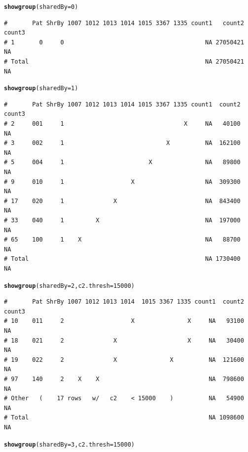 \documentclass{article}\usepackage[]{graphicx}\usepackage[]{color}
\makeatletter
\newcommand{\hlnum}[1]{\textcolor[rgb]{0.686,0.059,0.569}{#1}}%
\newcommand{\hlstd}[1]{\textcolor[rgb]{0.345,0.345,0.345}{#1}}%
\newcommand{\hlkwc}[1]{\textcolor[rgb]{0.333,0.667,0.333}{#1}}%
\newcommand{\hlkwd}[1]{\textcolor[rgb]{0.737,0.353,0.396}{\textbf{#1}}}%
\newenvironment{kframe}{%
 \def\at@end@of@kframe{}%
 \ifinner\ifhmode%
  \def\at@end@of@kframe{\end{minipage}}%
  \begin{minipage}{\columnwidth}%
 \fi\fi%
 \def\FrameCommand##1{\hskip\@totalleftmargin \hskip-\fboxsep
 \colorbox{shadecolor}{##1}\hskip-\fboxsep
     \hskip-\linewidth \hskip-\@totalleftmargin \hskip\columnwidth}%
 \MakeFramed {\advance\hsize-\width
   \@totalleftmargin\z@ \linewidth\hsize
   \@setminipage}}%
 {\par\unskip\endMakeFramed%
 \at@end@of@kframe}
\newenvironment{knitrout}{}{} %
\makeatother
\begin{document}
\begin{knitrout}\footnotesize
{}\color{fgcolor}\begin{kframe}
\begin{alltt}
\hlkwd{showgroup}\hlstd{(}\hlkwc{sharedBy}\hlstd{=}\hlnum{0}\hlstd{)}
\end{alltt}
\begin{verbatim}
#       Pat ShrBy 1007 1012 1013 1014 1015 3367 1335 count1   count2 count3
# 1       0     0                                        NA 27050421     NA
# Total                                                  NA 27050421     NA
\end{verbatim}
\begin{alltt}
\hlkwd{showgroup}\hlstd{(}\hlkwc{sharedBy}\hlstd{=}\hlnum{1}\hlstd{)}
\end{alltt}
\begin{verbatim}
#       Pat ShrBy 1007 1012 1013 1014 1015 3367 1335 count1  count2 count3
# 2     001     1                                  X     NA   40100     NA
# 3     002     1                             X          NA  162100     NA
# 5     004     1                        X               NA   89800     NA
# 9     010     1                   X                    NA  309300     NA
# 17    020     1              X                         NA  843400     NA
# 33    040     1         X                              NA  197000     NA
# 65    100     1    X                                   NA   88700     NA
# Total                                                  NA 1730400     NA
\end{verbatim}
\begin{alltt}
\hlkwd{showgroup}\hlstd{(}\hlkwc{sharedBy}\hlstd{=}\hlnum{2}\hlstd{,} \hlkwc{c2.thresh}\hlstd{=}\hlnum{15000}\hlstd{)}
\end{alltt}
\begin{verbatim}
#       Pat ShrBy 1007 1012 1013 1014  1015 3367 1335 count1  count2 count3
# 10    011     2                   X               X     NA   93100     NA
# 18    021     2              X                    X     NA   30400     NA
# 19    022     2              X               X          NA  121600     NA
# 97    140     2    X    X                               NA  798600     NA
# Other   (    17 rows   w/   c2    < 15000    )          NA   54900     NA
# Total                                                   NA 1098600     NA
\end{verbatim}
\begin{alltt}
\hlkwd{showgroup}\hlstd{(}\hlkwc{sharedBy}\hlstd{=}\hlnum{3}\hlstd{,} \hlkwc{c2.thresh}\hlstd{=}\hlnum{15000}\hlstd{)}

\end{alltt}
\end{kframe}
\end{knitrout}
\end{document}
